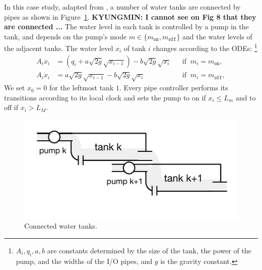 In this case study, adapted from
\cite{kowalewski1999case,raisch1999approximating}, 
a number of water tanks are connected by pipes as shown in
Figure~\ref{fig:water}.  \textbf{KYUNGMIN: I cannot see on Fig 8 that
  they are connected ...}
The water level in each tank is controlled by a pump in the tank, and 
 depends on the pump's mode $m \in \{m_\texttt{on}, m_\texttt{off}\}$
and the water levels of the adjacent tanks.
The water level $x_i$ of tank $i$ changes according to the ODEs:%
\footnote{%
$A_i, q_i, a, b $ are constants determined by the size of the tank, the power of the pump, 
and the widths of the I/O pipes,
and $g$ is the %
gravity constant.}
\[
\begin{aligned}
A_i \dot{x}_i &=  (q_i + a \sqrt{2g} \sqrt{x_{i-1}})  - b \sqrt{2g} \sqrt{x_i}
&& \mbox{if}\;\; m_i = m_\texttt{on},
\\
A_i \dot{x}_i &= a \sqrt{2g} \sqrt{x_{i-1}}  - b \sqrt{2g} \sqrt{x_i}
&& \mbox{if}\;\; m_i = m_\texttt{off},
\end{aligned}
\]
We set $x_0 = 0$ for the leftmost tank $1$.
%
Every pipe controller performs its transitions according to its local
clock and sets  
the pump to on if $x_i \leq L_m$ and to off if $x_i > L_M$.

\begin{figure}
\centering
\includegraphics[clip=true,trim=0.3cm 0.35cm 0.3cm 0.35cm,width=0.7\columnwidth]{water.pdf}    
\caption{Connected water tanks.}  \label{fig:water}
\end{figure}

